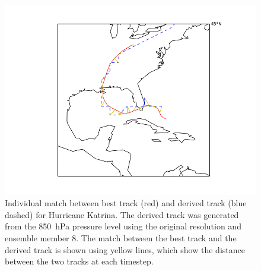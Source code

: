 \documentclass[pdftex,12pt,a4paper]{report}
\begin{document}
\begin{figure}[hb!]
    \centering
    \includegraphics[width=\linewidth]{figures/katrina_individual_match_em7}
    \caption{Individual match between best track (red) and derived track (blue dashed) for Hurricane
        Katrina. The derived track was generated from the \SI{850}{hPa} pressure level using the
        original resolution and ensemble member 8. The match between the best track and the derived
        track is shown using yellow lines, which show the distance between the two tracks at each
        timestep. 
    }
    \label{fig:katrina_individual_match_em7}
\end{figure}
\end{document}
